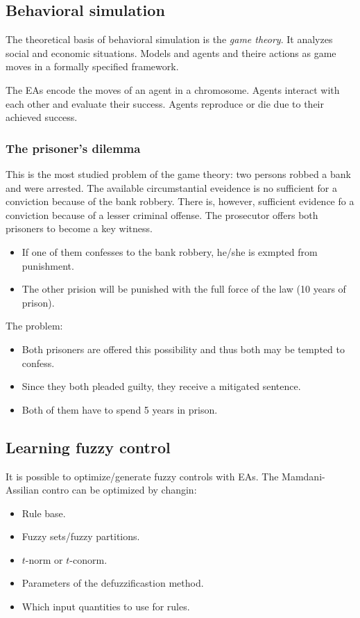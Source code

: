 \documentclass{article}
\begin{document}
\subsection{Behavioral simulation}
The theoretical basis of behavioral simulation is the \textit{game theory}. It analyzes social and
economic situations. Models and agents and theire actions as game moves in a formally specified framework.

The EAs encode the moves of an agent in a chromosome. Agents interact with each other and evaluate
their success. Agents reproduce or die due to their achieved success.

\subsubsection{The prisoner's dilemma}
This is the most studied problem of the game theory: two persons robbed a bank and were arrested. The
available circumstantial eveidence is no sufficient for a conviction because of the bank robbery. There
is, however, sufficient evidence fo a conviction because of a lesser criminal offense. The prosecutor
offers both prisoners to become a key witness.

\begin{itemize}
    \item If one of them confesses to the bank robbery, he/she is exmpted from punishment.
    \item The other prision will be punished with the full force of the law (10 years of prison).
\end{itemize}

The problem:
\begin{itemize}
    \item Both prisoners are offered this possibility and thus both may be tempted to confess.
    \item Since they both pleaded guilty, they receive a mitigated sentence.
    \item Both of them have to spend 5 years in prison.
\end{itemize}

\subsection{Learning fuzzy control}
It is possible to optimize/generate fuzzy controls with EAs. The Mamdani-Assilian contro can be
optimized by changin:
\begin{itemize}
    \item Rule base.
    \item Fuzzy sets/fuzzy partitions.
    \item $t$-norm or $t$-conorm.
    \item Parameters of the defuzzificastion method.
    \item Which input quantities to use for rules.
\end{itemize}
\end{document}
